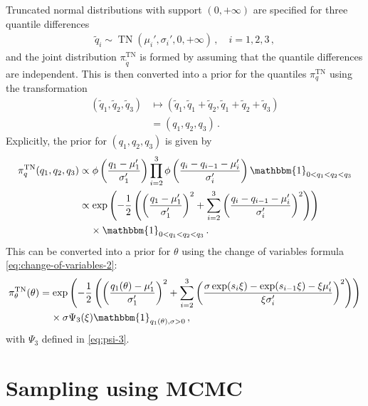 \documentclass{article}
\begin{document}
%
%
Truncated normal distributions with support $(0, +\infty)$ are specified for three quantile differences
%
\begin{align*}
	\tilde{q}_i \sim \operatorname{TN}(\mu_i', \sigma_i', 0, +\infty)
		\,, \quad i = 1, 2, 3 \,,
\end{align*}
%
and the joint distribution $\pi_{\tilde{q}}^{\text{TN}}$
is formed by assuming that the quantile differences are independent.
This is then converted into a prior for the quantiles
$\pi_q^{\text{TN}}$ using the transformation
%
\begin{align*}
	(\tilde{q}_1, \tilde{q}_2, \tilde{q}_3)
		&\mapsto (\tilde{q}_1, \tilde{q}_1 + \tilde{q}_2, \tilde{q}_1
		+ \tilde{q}_2 + \tilde{q}_3)\\
	&=(q_1, q_2, q_3)\,.
\end{align*}
%
Explicitly, the prior for $(q_1, q_2, q_3)$ is given by
%
\begin{align}
	\pi^{\text{TN}}_q(q_{1}, q_{2}, q_{3})
		&\propto \phi\left(\frac{q_1 - \mu_1'}{\sigma_1'}\right)
		\prod_{i=2}^{3} \phi\left(\frac{q_i - q_{i - 1} - \mu_i'}{\sigma_i'}\right)
		\mathbbm{1}_{0 < q_1 < q_2 < q_3} \\
	&\propto \exp\left(-\frac{1}{2}
		\left(\left(\frac{q_1 - \mu_1'}{\sigma_1'}\right) ^ 2
		+ \sum_{i=2}^{3}
		\left(\frac{q_i - q_{i - 1} - \mu_i'}{\sigma_i'}\right) ^ 2\right
		)\right) \\
	&\ \phantom{=} \times \mathbbm{1}_{0 < q_1 < q_2 < q_3} \,.
\end{align}
%
This can be converted into a prior for $\theta$ using the
change of variables formula \eqref{eq:change-of-variables-2}:
%
\begin{align}
	\pi^{\text{TN}}_\theta(\theta)
		&= \exp\left(-\frac{1}{2}
		\left(\left(\frac{q_1(\theta) - \mu_1'}{\sigma_1'}\right) ^ 2
		+ \sum_{i=2}^{3}
		\left(\frac{\sigma \exp(s_{i} \xi)
		- \exp(s_{i - 1}\xi) - \xi \mu_i'}{\xi \sigma_i'}\right) ^ 2\right
		)\right) \\
	&\ \phantom{=} \times \sigma \Psi_3(\xi)
		\mathbbm{1}_{q_1(\theta), \sigma > 0} \,,
\end{align}
%
with $\Psi_3$ defined in \eqref{eq:psi-3}.
%
\section{Sampling using MCMC}
\label{section:mcmc}
%
\end{document}

